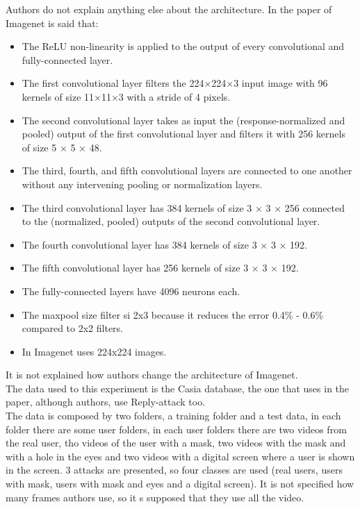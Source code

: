 Authors do not explain anything else about the architecture. In the paper of Imagenet is said that:

\begin{itemize}
\item The ReLU non-linearity is applied to the output of every convolutional and fully-connected layer.
\item The first convolutional layer filters the 224×224×3 input image with 96 kernels of size 11×11×3 with a stride of 4 pixels.
\item The second convolutional layer takes as input the (response-normalized and pooled) output of the first convolutional layer and filters it with 256 kernels of size 5 × 5 × 48.
\item The third, fourth, and fifth convolutional layers are connected to one another without any intervening pooling or normalization layers.
\item The third convolutional layer has 384 kernels of size 3 × 3 × 256 connected to the (normalized, pooled) outputs of the second convolutional layer.
\item The fourth convolutional layer has 384 kernels of size 3 × 3 × 192.
\item  The fifth convolutional layer has 256 kernels of size 3 × 3 × 192.
\item The fully-connected layers have 4096 neurons each.
\item The maxpool size filter si 2x3 because it reduces the error 0.4\% - 0.6\% compared to 2x2 filters.
\item In Imagenet uses 224x224 images.
\end{itemize}

It is not explained how authors change the architecture of Imagenet.\\

The data used to this experiment is the Casia database, the one that uses in the paper, although authors, use Reply-attack too.\\

The data is composed by two folders, a training folder and a test data, in each folder there are some user folders, in each user folders there are two videos from the real user, tho videos of the user with a mask, two videos with the mask and with a hole in the eyes and two videos with a digital screen where a user is shown in the screen. 3 attacks are presented, so four classes are used (real users, users with mask, users with mask and eyes and a digital screen). It is not specified how many frames authors use, so it s supposed that they use all the video.\\


